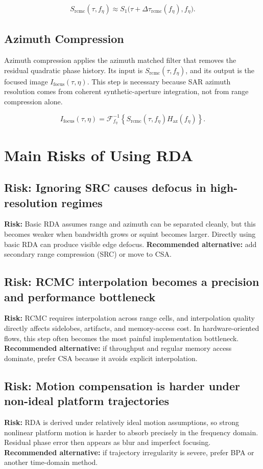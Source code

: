 \documentclass[journal,onecolumn]{IEEEtran}
\begin{document}
\begin{align}
S_{\mathrm{rcmc}}(\tau,f_\eta)\approx S_1\biggl(\tau+\Delta\tau_{\mathrm{rcmc}}(f_\eta),f_\eta\biggr).
\end{align}
\subsection{Azimuth Compression}
Azimuth compression applies the azimuth matched filter that removes the residual quadratic phase history. Its input is $S_{\mathrm{rcmc}}(\tau,f_\eta)$, and its output is the focused image $I_{\mathrm{focus}}(\tau,\eta)$. This step is necessary because SAR azimuth resolution comes from coherent synthetic-aperture integration, not from range compression alone.

\begin{equation}
I_{\mathrm{focus}}(\tau,\eta)= \mathcal{F}^{-1}_{f_\eta} \left\{ S_{\mathrm{rcmc}}(\tau,f_\eta)H_{\mathrm{az}}(f_\eta) \right\}.
\end{equation}
\section{Main Risks of Using RDA}
\subsection{Risk: Ignoring SRC causes defocus in high-resolution regimes}
\textbf{Risk:} Basic RDA assumes range and azimuth can be separated cleanly, but this becomes weaker when bandwidth grows or squint becomes larger. Directly using basic RDA can produce visible edge defocus. \textbf{Recommended alternative:} add secondary range compression (SRC) or move to CSA.

\subsection{Risk: RCMC interpolation becomes a precision and performance bottleneck}
\textbf{Risk:} RCMC requires interpolation across range cells, and interpolation quality directly affects sidelobes, artifacts, and memory-access cost. In hardware-oriented flows, this step often becomes the most painful implementation bottleneck. \textbf{Recommended alternative:} if throughput and regular memory access dominate, prefer CSA because it avoids explicit interpolation.

\subsection{Risk: Motion compensation is harder under non-ideal platform trajectories}
\textbf{Risk:} RDA is derived under relatively ideal motion assumptions, so strong nonlinear platform motion is harder to absorb precisely in the frequency domain. Residual phase error then appears as blur and imperfect focusing. \textbf{Recommended alternative:} if trajectory irregularity is severe, prefer BPA or another time-domain method.
\end{document}
